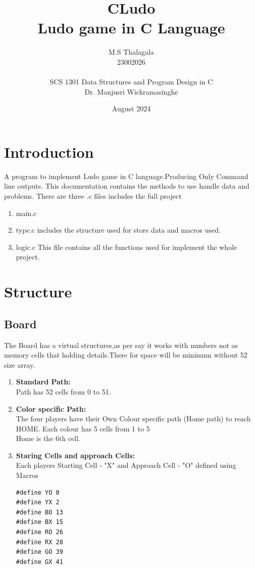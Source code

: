 \documentclass{article}
\title{\textbf{CLudo \\ Ludo game in C Language}}
\author{M.S Thalagala \\ 23002026 \\ \\ SCS 1301  Data Structures and Program Design in C \\ Dr. Manjusri Wickramasinghe}
\date{August 2024}
\begin{document}
\maketitle
\newpage
\tableofcontents
\newpage


\section{Introduction}
A program to implement Ludo game in C language.Producing Only Command line outputs. This documentation contains the methods to use handle data and problems.
There are three .c files includes the full project
\begin{enumerate}
    \item main.c
    \item type.c
    includes the structure used for store data and macros used.
    \item logic.c
    This file contains all the functions used for implement the whole project.
\end{enumerate}


\section{Structure}
\subsection{Board}
The Board has a virtual structures,as per say it works with numbers not as memory cells that holding details.There for space will be minimum without 52 size array.\\
\begin{enumerate}
    \item \textbf{Standard Path:}\\Path has 52 cells from 0 to 51.
    \item \textbf{Color specific Path:}\\The four players have their Own Colour specific path (Home path) to reach HOME. Each colour has 5 cells from 1 to 5\\Home is the 6th cell.
    \item \textbf{Staring Cells and approach Cells:}\\Each players Starting Cell - "X" and Approach Cell - "O" defined using Macros
    
\begin{verbatim}
#define YO 0
#define YX 2
#define BO 13
#define BX 15
#define RO 26
#define RX 28
#define GO 39
#define GX 41
\end{verbatim}    
\end{enumerate}
\end{document}
